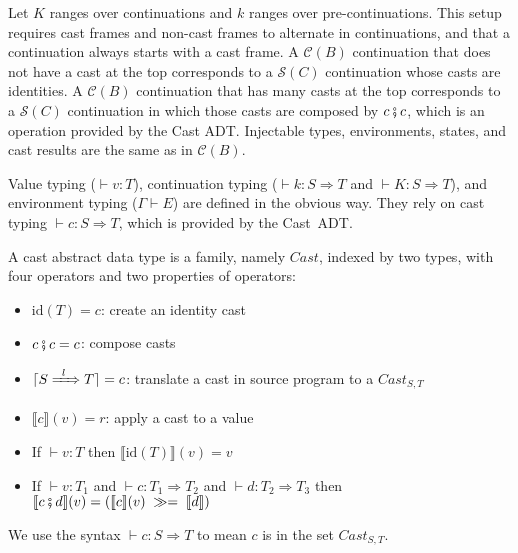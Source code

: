 \documentclass[runningheads]{llncs}
\newcommand{\CMachine}[1]{\ensuremath{\mathcal{C}(#1)}}
\newcommand{\CBMachine}[0]{\CMachine{B}}
\newcommand{\SMachine}[1]{\ensuremath{\mathcal{S}(#1)}}
\newcommand{\ccast}[3]{#1 \xRightarrow[]{\enskip #2 \enskip} #3}
\newcommand{\mbind}[0]{\ensuremath{\;\gg=\;}}
\newcommand{\denote}[1]{\ensuremath{\llbracket #1 \rrbracket}}
\newcommand{\compose}[2]{\ensuremath{#1 \fatsemi #2}}
\newcommand{\translate}[1]{\ensuremath{\lceil#1\rceil}}
\newcommand{\id}[1]{\ensuremath{\mathrm{id}(#1)}}
\newcommand{\valuetyping}[2]{\ensuremath{\vdash #1 : #2}}
\newcommand{\envtyping}[2]{\ensuremath{#1 \vdash #2}}
\newcommand{\casttyping}[3]{\ensuremath{\vdash #1 : #2 \Longrightarrow #3}}
\begin{document}
Let $K$ ranges over continuations and $k$ ranges over
pre-continuations.  This setup requires cast frames and non-cast
frames to alternate in continuations, and that a continuation always
starts with a cast frame.
A \CMachine{B} continuation that does not have a cast at the top
corresponds to a \SMachine{C} continuation whose casts are identities.
A \CMachine{B} continuation that has many casts at the top corresponds
to a \SMachine{C} continuation in which those casts are composed by
$\compose{c}{c}$, which is an operation provided by the Cast ADT.
%
Injectable types, environments, states, and cast results are the same
as in \CBMachine.

Value typing (\valuetyping{v}{T}), continuation typing
(\casttyping{k}{S}{T} and \casttyping{K}{S}{T}), and environment
typing (\envtyping{\Gamma}{E}) are defined in the obvious way.  They
rely on cast typing \casttyping{c}{S}{T}, which is provided by the
Cast~ADT.

\begin{definition}
	\label{def:cast-rep}
	A cast abstract data type is a family, namely $Cast$, indexed by two types, 
	with four operators and two properties of operators:
\begin{itemize}
	\item $\id{T}=c$: create an identity cast
	\item $\compose{c}{c}=c$: compose casts
	\item $\translate{\ccast{S}{l}{T}}=c$: translate a cast in source 
		program to a $\textit{Cast}_{S,T}$
	\item $\denote{c}(v)=r$: apply a cast to a value
	\item If $ \valuetyping{v}{T} $ then $\denote{\id{T}}(v)=v$
	\item If $ \valuetyping{v}{T_1} $ and
		$ \casttyping{c}{T_1}{T_2} $ and
		$ \casttyping{d}{T_2}{T_3} $ 
		then 
		$ \denote{\compose{c}{d}}(v) = (\denote{c}(v)\mbind\denote{d})$
\end{itemize}
We use the syntax \casttyping{c}{S}{T} to mean $c$ is in the set 
$\textit{Cast}_{S,T}$.
\end{definition}
\end{document}
